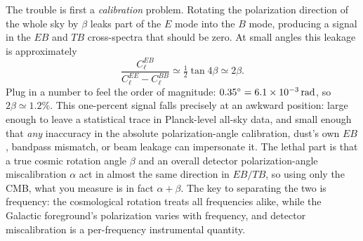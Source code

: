The trouble is first a \emph{calibration} problem. Rotating the polarization direction of the whole sky by \(\beta\) leaks part of the \(E\) mode into the \(B\) mode, producing a signal in the \(EB\) and \(TB\) cross-spectra that should be zero. At small angles this leakage is approximately
\[
  \frac{C_\ell^{EB}}{C_\ell^{EE}-C_\ell^{BB}}\simeq \tfrac12\tan 4\beta\simeq 2\beta .
\]
Plug in a number to feel the order of magnitude: \(0.35^\circ=6.1\times10^{-3}\,{\rm rad}\), so \(2\beta\simeq1.2\%\). This one-percent signal falls precisely at an awkward position: large enough to leave a statistical trace in Planck-level all-sky data, and small enough that \emph{any} inaccuracy in the absolute polarization-angle calibration, dust's own \(EB\), bandpass mismatch, or beam leakage can impersonate it. The lethal part is that a true cosmic rotation angle \(\beta\) and an overall detector polarization-angle miscalibration \(\alpha\) act in almost the same direction in \(EB/TB\), so using only the CMB, what you measure is in fact \(\alpha+\beta\). The key to separating the two is frequency: the cosmological rotation treats all frequencies alike, while the Galactic foreground's polarization varies with frequency, and detector miscalibration is a per-frequency instrumental quantity.

